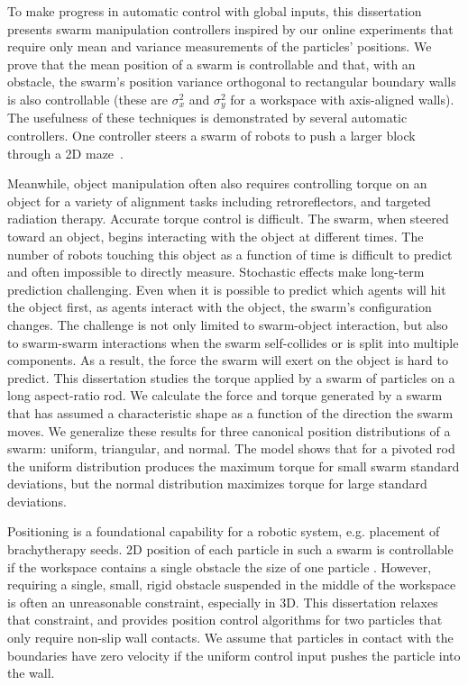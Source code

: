  To make progress in automatic control with global inputs, this dissertation presents swarm manipulation controllers inspired by our online experiments that require only mean and variance measurements of the particles' positions. 
We prove that the mean position of a swarm is controllable and that, with an obstacle, the swarm's position variance orthogonal to rectangular boundary walls  is also controllable
(these are $\sigma_x^2$ and $\sigma_y^2$ for a workspace with axis-aligned walls). 
The usefulness of these techniques is demonstrated by several automatic controllers. One controller steers a swarm of robots to push a larger block through a 2D maze~\cite{ShahrokhiIROS2015}. 

 Meanwhile, object manipulation often also requires controlling torque on an object for a variety of alignment tasks including retroreflectors, and targeted radiation therapy.
 Accurate torque control is difficult.
 The swarm, when steered toward an object, begins interacting with the object at different times. 
The number of robots touching this object as a function of time is difficult to predict and often impossible to directly measure.
Stochastic effects make long-term prediction challenging.  
Even when it is possible to predict which agents will hit the object first, as agents interact with the object, the swarm's configuration changes.
The challenge is not only limited to swarm-object interaction, but also to swarm-swarm interactions when the swarm self-collides  or is split into multiple components.
 As a result, the force the swarm will exert on the object is hard to predict.
 This dissertation studies the torque applied by a swarm of particles on a long aspect-ratio rod. We calculate the force and torque generated by a swarm that has assumed a characteristic shape as a function of the direction the swarm moves.
We generalize these results for three canonical position distributions of a swarm: uniform, triangular, and normal. The model shows that for a pivoted rod the uniform distribution produces the maximum torque for small swarm standard deviations, but the normal distribution maximizes torque for large standard deviations.


 Positioning is a foundational capability for a robotic system, e.g. placement of brachytherapy seeds. 
 2D position of each particle in such a swarm is controllable if the workspace contains a single obstacle the size of one particle \cite{AaronManipulation2013}.
 However, requiring a single, small, rigid obstacle suspended in the middle of the workspace is often an unreasonable constraint, especially in 3D.
 This dissertation relaxes that constraint, and provides position control algorithms for two particles that only require non-slip wall contacts.
 We assume that particles in contact with the boundaries have zero velocity if the uniform control input pushes the particle into the wall.
 
